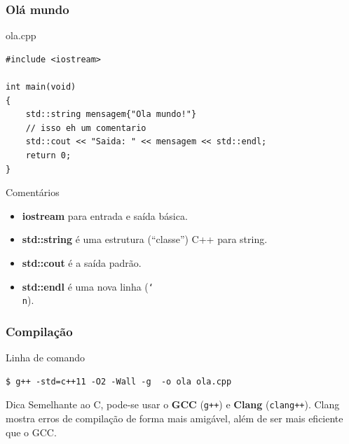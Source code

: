 \documentclass[xcolor={usenames,dvipsnames},10pt,compress,aspectratio=169]{beamer}
\begin{document}
\begin{frame}[fragile]
  \frametitle{Olá mundo}
  \vspace{-2mm}
  \begin{block}{ola.cpp}
\begin{lstlisting}
#include <iostream>

int main(void)
{
    std::string mensagem{"Ola mundo!"}
    // isso eh um comentario
    std::cout << "Saida: " << mensagem << std::endl;
    return 0;
}
\end{lstlisting}
\end{block}
%
\begin{exampleblock}{Comentários}
\begin{itemize}
\item \textbf{iostream} para entrada e saída básica.
\item \textbf{std::string} é uma estrutura (``classe'') C++ para string.
\item \textbf{std::cout} é a saída padrão.
\item \textbf{std::endl} é uma nova linha (\texttt{\char`\\n}).
\end{itemize}
\end{exampleblock}
%
\end{frame}
\begin{frame}[fragile]
  \frametitle{Compilação}
\begin{exampleblock}{Linha de comando}
\begin{lstlisting}
$ g++ -std=c++11 -O2 -Wall -g  -o ola ola.cpp
\end{lstlisting}
\end{exampleblock}
%
\begin{alertblock}{Dica}
Semelhante ao C, pode-se usar o \textbf{GCC} (\texttt{g++}) e \textbf{Clang}
(\texttt{clang++}).
Clang mostra erros de compilação de forma mais amigável, além de ser mais 
eficiente que o GCC.
\end{alertblock}
\end{frame}
\end{document}
